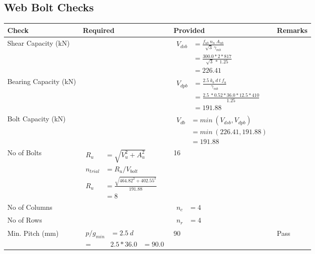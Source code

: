 \documentclass{article}%
\begin{document}
\subsection{Web Bolt Checks}%
\label{subsec:WebBoltChecks}%
\renewcommand{\arraystretch}{1.2}%
\begin{longtable}{|p{4cm}|p{5cm}|p{5.5cm}|p{1.5cm}|}%
\hline%
\rowcolor{OsdagGreen}%
Check&Required&Provided&Remarks\\%
\hline%
\endhead%
\hline%
Shear Capacity (kN)&&$\begin{aligned}V_{dsb} &= \frac{f_{ub} ~n_n~ A_{nb}}{\sqrt{3} ~\gamma_{mb}}\\ &= \frac{300.0*2*817}{\sqrt{3}~*~1.25}\\ &= 226.41\end{aligned}$&\\%
\hline%
Bearing Capacity (kN)&&$\begin{aligned}V_{dpb} &= \frac{2.5~ k_b~ d~ t~ f_u}{\gamma_{mb}}\\ &= \frac{2.5~*0.52*36.0*12.5*410}{1.25}\\ &=191.88\end{aligned}$&\\%
\hline%
Bolt Capacity (kN)&&$\begin{aligned}V_{db} &= min~ (V_{dsb}, V_{dpb})\\ &= min~ (226.41,191.88)\\ &=191.88\end{aligned}$&\\%
\hline%
No of Bolts&$\begin{aligned}R_{u} &= \sqrt{V_u^2+A_u^2}\\ n_{trial} &= R_u/ V_{bolt}\\ R_{u} &= \frac{\sqrt{464.82^2+402.55^2}}{191.88}\\ &=8\end{aligned}$&16&\\%
\hline%
No of Columns&&$\begin{aligned} n_c &=4\end{aligned}$&\\%
\hline%
No of Rows&&$\begin{aligned} n_r &=4\end{aligned}$&\\%
\hline%
Min. Pitch (mm)&$\begin{aligned}p/g_{min}&= 2.5 ~ d&\\ =&2.5*36.0&=90.0\end{aligned}$&90&Pass\\%
\hline%

\end{longtable}
\end{document}
